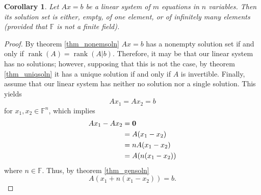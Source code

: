 \documentclass[oneside, 12pt]{book}
\DeclareMathOperator{\rank}{rank}
\newtheorem{cor}{Corollary}[section]
\theoremstyle{definition}
\begin{document}
\begin{cor}
\label{cor_infsoln}
Let $Ax=b$ be a linear system of $m$ equations in $n$ variables. Then its solution set is either, empty, of one element, or of infinitely many elements (provided that $\mathbb{F}$ is not a finite field).
\end{cor}
\begin{proof}
  By theorem \ref{thm_nonemsoln} $Ax=b$ has a nonempty solution set if and only if $\rank(A)=\rank(A|b)$. Therefore, it may be that our linear system has no solutions; however, supposing that this is not the case, by theorem \ref{thm_uniqsoln} it has a unique solution if and only if $A$ is invertible. Finally, assume that our linear system has neither no solution nor a single solution. This yields
  \begin{equation}
Ax_{1}=Ax_{2}=b
\end{equation}
for $x_{1}, x_{2} \in \mathbb{F}^{n}$, which implies
\begin{align}
  Ax_{1}-Ax_{2}&=\bold{0} \\
               &=A(x_{1}-x_{2}) \\
               &= nA(x_{1}-x_{2}) \\
               &= A(n(x_{1}-x_{2})) \\
\end{align}
where $n \in \mathbb{F}$.
Thus, by theorem \ref{thm_gensoln}
\[A(x_{1}+n(x_{1}-x_{2}))=b.\]
\end{proof}
\end{document}
